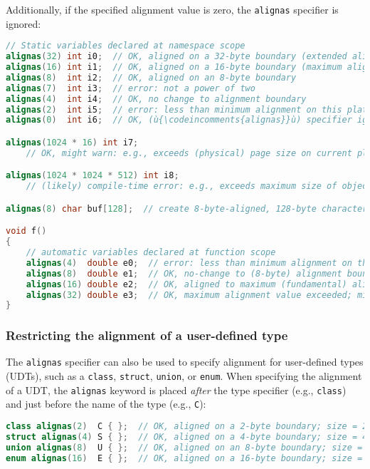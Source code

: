 \noindent Additionally, if the specified alignment value is zero, the
\texttt{alignas} specifier is ignored:

\begin{lstlisting}[language=C++]
// Static variables declared at namespace scope
alignas(32) int i0;  // OK, aligned on a 32-byte boundary (extended alignment)
alignas(16) int i1;  // OK, aligned on a 16-byte boundary (maximum alignment)
alignas(8)  int i2;  // OK, aligned on an 8-byte boundary
alignas(7)  int i3;  // error: not a power of two
alignas(4)  int i4;  // OK, no change to alignment boundary
alignas(2)  int i5;  // error: less than minimum alignment on this platform
alignas(0)  int i6;  // OK, (ù{\codeincomments{alignas}}ù) specifier ignored

alignas(1024 * 16) int i7;
    // OK, might warn: e.g., exceeds (physical) page size on current platform

alignas(1024 * 1024 * 512) int i8;
    // (likely) compile-time error: e.g., exceeds maximum size of object file

alignas(8) char buf[128];  // create 8-byte-aligned, 128-byte character buffer

void f()
{
    // automatic variables declared at function scope
    alignas(4)  double e0;  // error: less than minimum alignment on this platform
    alignas(8)  double e1;  // OK, no-change to (8-byte) alignment boundary
    alignas(16) double e2;  // OK, aligned to maximum (fundamental) alignment value
    alignas(32) double e3;  // OK, maximum alignment value exceeded; might warn
}
\end{lstlisting}
    
\subsubsection[Restricting the alignment of a user-defined type]{Restricting the alignment of a user-defined type}\label{restricting-the-alignment-of-a-user-defined-type}

The \texttt{alignas} specifier can also be used to specify alignment for
user-defined types (UDTs), such as a \texttt{class}, \texttt{struct},
\texttt{union}, or \texttt{enum}. When specifying the alignment of a UDT,
 the \texttt{alignas} keyword is placed \emph{after} the
type specifier (e.g., \texttt{class}) and just before the name of the
type (e.g., \texttt{C}):

\begin{lstlisting}[language=C++]
class alignas(2)  C { };  // OK, aligned on a 2-byte boundary; size = 2
struct alignas(4) S { };  // OK, aligned on a 4-byte boundary; size = 4
union alignas(8)  U { };  // OK, aligned on an 8-byte boundary; size = 8
enum alignas(16)  E { };  // OK, aligned on a 16-byte boundary; size = 4
\end{lstlisting}
    
